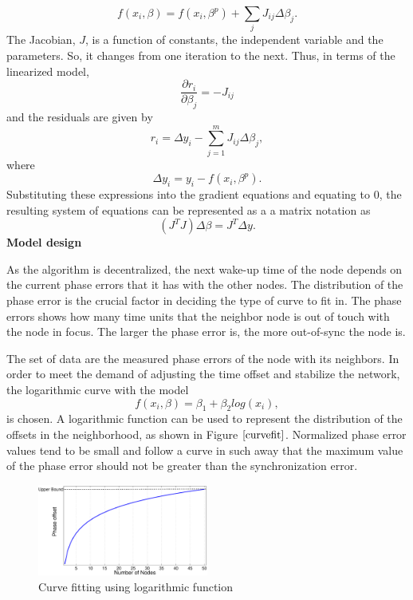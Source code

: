 \documentclass[journal]{IEEEtran}
\begin{document}
\begin{equation}
 f(x_i,\beta) =f(x_i, \beta^p)+\sum_j J_{ij} \Delta\beta_j.
\end{equation}
The Jacobian, $J$, is a function of constants, the independent
variable and the parameters. So, it changes from one iteration to the
next. Thus, in terms of the linearized model,
\begin{equation}
\frac{\partial r_i}{\partial \beta_j}=-J_{ij}
\end{equation}
and the residuals are given by
\begin{equation}
    r_i=\Delta y_i- \sum_{j=1}^{m} J_{ij}\Delta\beta_j,
\end{equation}
where
\begin{equation}
 \Delta y_i=y_i- f(x_i, \beta^p).
\end{equation}
Substituting these expressions into the gradient equations and
equating to $0$, the resulting system of equations can be represented as a a matrix notation as
\begin{equation}
    \left(J^TJ\right)\Delta  \beta=J^T\Delta y.
\end{equation}
\textbf{Model design} \par
As the algorithm is decentralized, the next wake-up time of the node depends on
the current phase errors that it has with the other nodes. The distribution of the phase error is the crucial factor in deciding the type of curve to fit in. The phase errors shows how many time units that the neighbor node is out of touch with the node in focus. The larger the phase error is, the more out-of-sync the node is.\par
The set of data are the measured phase errors of the node with its neighbors.
In order to meet the demand of adjusting the time offset and stabilize the network, the logarithmic curve with the model
\begin{equation}
 f(x_i,\beta)= \beta _1 + \beta_2log(x_i),
\end{equation}
is chosen. A logarithmic function can be used to represent the distribution of the offsets in the neighborhood, as shown in Figure $\ref{curvefit}$.
Normalized phase error values tend to be small and follow a curve in such away that the maximum value of the phase error should not be greater than the synchronization error.
\begin{figure}
\centering
\includegraphics[width=0.5\textwidth]{curvefit}
\caption{Curve fitting using logarithmic function} \label{curvefit}
\end{figure}
\end{document}
